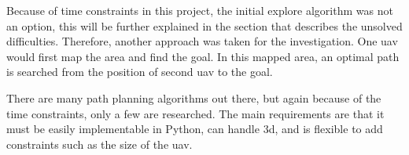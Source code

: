 Because of time constraints in this project, the initial explore algorithm was not an option, this will be further explained in the section that describes the unsolved difficulties. Therefore, another approach was taken for the investigation. One \acs{uav} would first map the area and find the goal. In this mapped area, an optimal path is searched from the position of second \acs{uav} to the goal.

There are many path planning algorithms out there, but again because of the time constraints, only a few are researched. The main requirements are that it must be easily implementable in Python, can handle \acs{3d}, and is flexible to add constraints such as the size of the \acs{uav}.